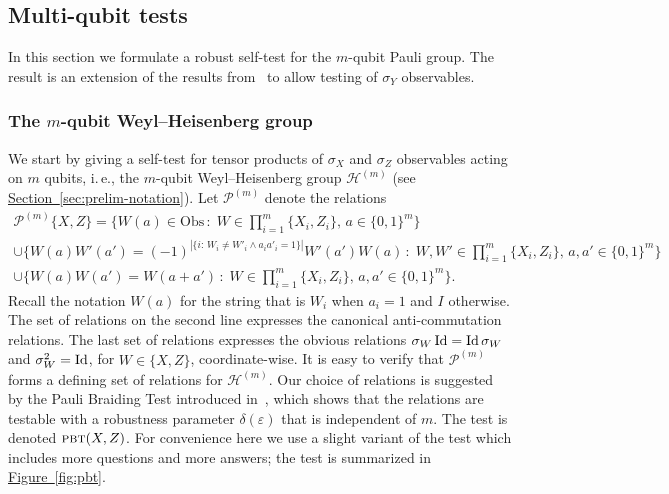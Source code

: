 \documentclass[11pt]{article}
\numberwithin{equation}{section}
\theoremstyle{definition}
\theoremstyle{plain}
\newcommand{\ie}{i.\,e.}
\newcommand{\expref}[2]{\hyperref[#2]{#1~\ref{#2}}}
\newcommand{\Id}{\ensuremath{\mathop{\rm Id}\nolimits}}
\newcommand{\setft}[1]{\mathrm{#1}}
\newcommand{\Obs}{\setft{Obs}}
\newcommand{\eps}{\varepsilon}
\newcommand{\pbt}{\textsc{pbt}}
\newcommand{\paulin}{\mathcal{P}^{(m)}\!}
\begin{document}
\subsection{Multi-qubit tests}
\label{sec:pauli-group}


In this section we formulate a robust self-test for the $m$-qubit Pauli group. The result is an extension of the results from~\cite{natarajan2016robust} to allow testing of $\sigma_Y$ observables. 

\subsubsection{The \texorpdfstring{$m$}{m}-qubit Weyl--Heisenberg group}
\label{sec:pbt}


We start by giving a self-test for tensor products of $\sigma_X$ and $\sigma_Z$ 
observables acting on $m$ qubits, \ie, the $m$-qubit Weyl--Heisenberg group $\mathcal{H}^{(m)}$ (see \expref{Section}{sec:prelim-notation}). 
Let $\mathcal{P}^{(m)}$ denote the relations  
\begin{multline*}    %
%
\paulin\{X,Z\} = \Big\{ W(a)\in\Obs\,: \;W \in \prod_{i=1}^m \{X_i,Z_i\},\,a\in\{0,1\}^m\Big\}\\
\cup \Big\{W(a)W'(a')=(-1)^{|\{i:\,W_i\neq W'_i \wedge a_ia'_i=1\}|} W'(a')W(a)\,:\;W,W' \in \prod_{i=1}^m \{X_i,Z_i\},\, a,a'\in\{0,1\}^m\Big\}\\
 \cup\Big\{ W(a)W(a')=W(a+a')\,:\;W \in \prod_{i=1}^m \{X_i,Z_i\},\, a,a'\in\{0,1\}^m\Big\}.
\end{multline*}
Recall the notation $W(a)$ for the string that is $W_i$ when $a_i=1$ and $I$ otherwise. 
The set of relations on the second line expresses the canonical anti-commutation relations. The last set of relations expresses the obvious relations $\sigma_W \Id = \Id \sigma_W$ and $\sigma_W^2 = \Id$, for $W\in\{X,Z\}$, coordinate-wise. It is easy to verify that $\mathcal{P}^{(m)}$ forms a defining set of relations for $\mathcal{H}^{(m)}$. Our choice of relations is suggested by the Pauli Braiding Test introduced in~\cite{natarajan2016robust}, which shows that the relations are testable with a robustness parameter $\delta(\eps)$ that is independent of $m$. 
The test is denoted $\pbt(X,Z)$. For convenience here we use a slight variant of the test which includes more questions and more answers; the test is summarized in \expref{Figure}{fig:pbt}. 
\end{document}

